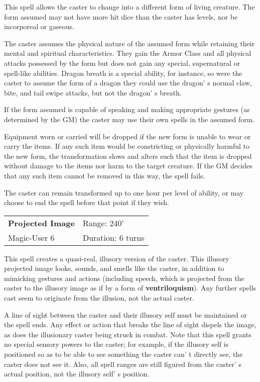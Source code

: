\documentclass[a4paper,twoside,openany,10pt]{book}
\begin{document}
\begin{multicols}{2}
This spell allows the caster to change into a different form of living creature. The form assumed may not have more hit dice than the caster has levels, nor be incorporeal or gaseous.

The caster assumes the physical nature of the assumed form while retaining their mental and spiritual characteristics. They gain the Armor Class and all physical attacks possessed by the form but does not gain any special, supernatural or spell-like abilities. Dragon breath is a special ability, for instance, so were the caster to assume the form of a dragon they could use the dragon' s normal claw, bite, and tail swipe attacks, but not the dragon' s breath.

If the form assumed is capable of speaking and making appropriate gestures (as determined by the GM) the caster may use their own spells in the assumed form.

Equipment worn or carried will be dropped if the new form is unable to wear or carry the items. If any such item would be constricting or physically harmful to the new form, the transformation slows and alters such that the item is dropped without damage to the items nor harm to the target creature. If the GM decides that any such item cannot be removed in this way, the spell fails.

The caster can remain transformed up to one hour per level of ability, or may choose to end the spell before that point if they wish.

\smallskip\begin{flushleft} 
	\begin{tabularx}{0.45\textwidth}{@{}m{3.5cm}m{5.5cm}@{}} 
		\textbf{Projected Image} & Range: 240'\\
Magic-User 6 & Duration: 6 turns\\
	\end{tabularx}\end{flushleft}

This spell creates a quasi-real, illusory version of the caster. This illusory projected image looks, sounds, and smells like the caster, in addition to mimicking gestures and actions (including speech, which is projected from the caster to the illusory image as if by a form of \textbf{ventriloquism}). Any further spells cast seem to originate from the illusion, not the actual caster.

A line of sight between the caster and their illusory self must be maintained or the spell ends. Any effect or action that breaks the line of sight dispels the image, as does the illusionary caster being struck in combat. Note that this spell grants no special sensory powers to the caster; for example, if the illusory self is positioned so as to be able to see something the caster can' t directly see, the caster does not see it. Also, all spell ranges are still figured from the caster' s actual position, not the illusory self' s position.


\end{multicols}
\end{document}
